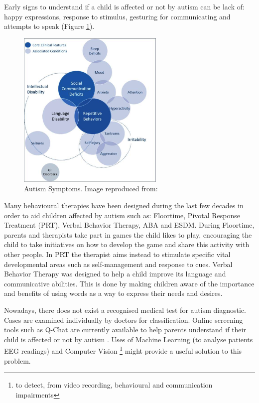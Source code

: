 Early signs to understand if a child is affected or not by autism can be lack of: happy expressions, response to stimulus, gesturing for communicating and attempts to speak \cite{signs} (Figure \ref{one}).

\begin{figure}[ht!]%
    \centering
    \includegraphics[width=7cm]{images/Autisms.png}%
    \caption{Autism Symptoms. Image reproduced from: \cite{symptoms}}%
    \label{one}
\end{figure}


Many behavioural therapies have been designed during the last few decades in order to aid children affected by autism such as: Floortime, Pivotal Response Treatment (PRT), Verbal Behavior Therapy, ABA and ESDM. During Floortime, parents and therapists take part in games the child likes to play, encouraging the child to take initiatives on how to develop the game and share this activity with other people. In PRT the therapist aims instead to stimulate specific vital developmental areas such as self-management and response to cues. Verbal Behavior Therapy was designed to help a child improve its language and communicative abilities. This is done by making children aware of the importance and benefits of using words as a way to express their needs and desires. 

Nowadays, there does not exist a recognised medical test for autism diagnostic. Cases are examined individually by doctors for classification. Online screening tools such as Q-Chat are currently available to help parents understand if their child is affected or not by autism \cite{screening}. Uses of Machine Learning (to analyse patients EEG readings) and Computer Vision \footnote{to detect, from video recording, behavioural and communication impairments} might provide a useful solution to this problem. 


